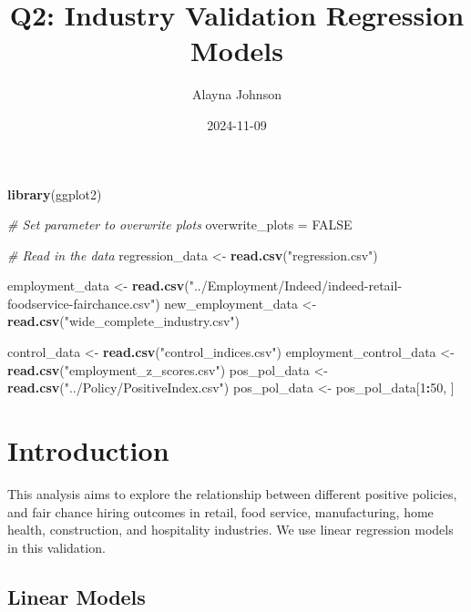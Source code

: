 \documentclass[
]{article}
\title{Q2: Industry Validation Regression Models}
\author{Alayna Johnson}
\date{2024-11-09}
\newenvironment{Shaded}{\begin{snugshade}}{\end{snugshade}}
\newcommand{\CommentTok}[1]{\textcolor[rgb]{0.56,0.35,0.01}{\textit{#1}}}
\newcommand{\ConstantTok}[1]{\textcolor[rgb]{0.56,0.35,0.01}{#1}}
\newcommand{\DecValTok}[1]{\textcolor[rgb]{0.00,0.00,0.81}{#1}}
\newcommand{\FunctionTok}[1]{\textcolor[rgb]{0.13,0.29,0.53}{\textbf{#1}}}
\newcommand{\NormalTok}[1]{#1}
\newcommand{\OtherTok}[1]{\textcolor[rgb]{0.56,0.35,0.01}{#1}}
\newcommand{\SpecialCharTok}[1]{\textcolor[rgb]{0.81,0.36,0.00}{\textbf{#1}}}
\newcommand{\StringTok}[1]{\textcolor[rgb]{0.31,0.60,0.02}{#1}}
\begin{document}
\maketitle

\begin{Shaded}
\begin{Highlighting}[]
\FunctionTok{library}\NormalTok{(ggplot2)}

\CommentTok{\# Set parameter to overwrite plots}
\NormalTok{overwrite\_plots }\OtherTok{=} \ConstantTok{FALSE}

\CommentTok{\# Read in the data}
\NormalTok{regression\_data }\OtherTok{\textless{}{-}} \FunctionTok{read.csv}\NormalTok{(}\StringTok{"regression.csv"}\NormalTok{)}

\NormalTok{employment\_data }\OtherTok{\textless{}{-}} \FunctionTok{read.csv}\NormalTok{(}\StringTok{"../Employment/Indeed/indeed{-}retail{-}foodservice{-}fairchance.csv"}\NormalTok{)}
\NormalTok{new\_employment\_data }\OtherTok{\textless{}{-}} \FunctionTok{read.csv}\NormalTok{(}\StringTok{"wide\_complete\_industry.csv"}\NormalTok{)}

\NormalTok{control\_data }\OtherTok{\textless{}{-}} \FunctionTok{read.csv}\NormalTok{(}\StringTok{"control\_indices.csv"}\NormalTok{)}
\NormalTok{employment\_control\_data }\OtherTok{\textless{}{-}} \FunctionTok{read.csv}\NormalTok{(}\StringTok{"employment\_z\_scores.csv"}\NormalTok{)}
\NormalTok{pos\_pol\_data }\OtherTok{\textless{}{-}} \FunctionTok{read.csv}\NormalTok{(}\StringTok{"../Policy/PositiveIndex.csv"}\NormalTok{)}
\NormalTok{pos\_pol\_data }\OtherTok{\textless{}{-}}\NormalTok{ pos\_pol\_data[}\DecValTok{1}\SpecialCharTok{:}\DecValTok{50}\NormalTok{, ]}
\end{Highlighting}
\end{Shaded}

\section{Introduction}\label{introduction}

This analysis aims to explore the relationship between different
positive policies, and fair chance hiring outcomes in retail, food
service, manufacturing, home health, construction, and hospitality
industries. We use linear regression models in this validation.

\subsection{Linear Models}\label{linear-models}
\end{document}
